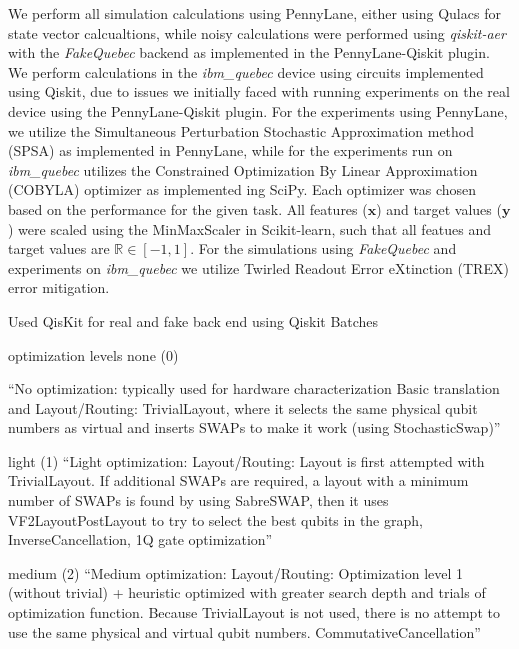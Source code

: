 \documentclass[journal=jacsat,manuscript=article]{achemso}
\begin{document}
We perform all simulation calculations using PennyLane\cite{bergholm_pennylane_2022}, either using Qulacs\cite{suzuki_qulacs_2021} for state vector calcualtions, while noisy calculations were performed using \textit{qiskit-aer} with the \textit{FakeQuebec} backend as implemented in the PennyLane-Qiskit plugin.\cite{javadi-abhari_quantum_2024}
We perform calculations in the \textit{ibm\_quebec} device using circuits implemented using Qiskit\cite{javadi-abhari_quantum_2024}, due to issues we initially faced with running experiments on the real device using the PennyLane-Qiskit plugin.
For the experiments using PennyLane,  we utilize the Simultaneous Perturbation Stochastic Approximation method (SPSA) as implemented in PennyLane, while for the experiments run on \textit{ibm\_quebec} utilizes the Constrained Optimization By Linear Approximation (COBYLA) optimizer as implemented ing SciPy\cite{virtanen_scipy_2020}.
Each optimizer was chosen based on the performance for the given task.
All features ($\mathbf{x}$) and target values ($\mathbf{y}$) were scaled using the MinMaxScaler in Scikit-learn\cite{pedregosa_scikit-learn_2011}, such that all featues and target values are $\mathbb{R}\in [ -1,1 ]$.
For the simulations using \textit{FakeQuebec} and experiments on \textit{ibm\_quebec} we utilize Twirled Readout Error eXtinction (TREX) error mitigation.



Used QisKit for real and fake back end using Qiskit Batches

optimization levels
none (0) 

``No optimization: typically used for hardware characterization
Basic translation and Layout/Routing: TrivialLayout, where it selects the same physical qubit numbers as virtual and inserts SWAPs to make it work (using StochasticSwap)''


light (1)
``Light optimization: Layout/Routing: Layout is first attempted with TrivialLayout. If additional SWAPs are required, a layout with a minimum number of SWAPs is found by using SabreSWAP, then it uses VF2LayoutPostLayout to try to select the best qubits in the graph, InverseCancellation, 1Q gate optimization''

medium (2)
``Medium optimization: Layout/Routing: Optimization level 1 (without trivial) + heuristic optimized with greater search depth and trials of optimization function. Because TrivialLayout is not used, there is no attempt to use the same physical and virtual qubit numbers. CommutativeCancellation''
\end{document}
